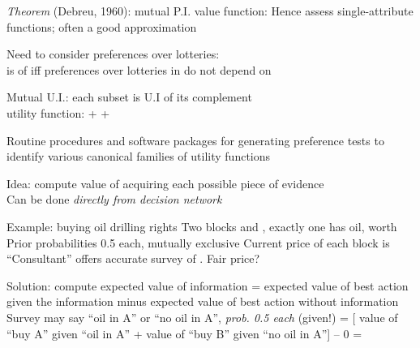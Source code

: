 \documentclass{article}
\begin{document}
\begin{huge}
\emph{Theorem} (Debreu, 1960): mutual P.I. \mat{$\implies$} \mat{$\exists$}  value function:
\mat{\[
  V(S) = \mysum_i V_i(X_i(S))
\]}
Hence assess  single-attribute functions; often a good approximation



Need to consider preferences over lotteries:\\
 is  of  iff\al
  preferences over lotteries in  do not depend on 

Mutual U.I.: each subset is U.I of its complement\\
\mat{$\implies$} \mat{$\exists$}  utility function:\al
{}\nl
 + \nl
 + 

Routine procedures and software packages for generating preference
tests to identify various canonical families of utility functions



Idea: compute value of acquiring each possible piece of evidence\\
Can be done \emph{directly from decision network}

Example: buying oil drilling rights\al
  Two blocks  and , exactly one has oil, worth \al
  Prior probabilities 0.5 each, mutually exclusive\al
  Current price of each block is \al
  ``Consultant'' offers accurate survey of . Fair price?

Solution: compute expected value of information\al
  = expected value of best action given the information\nl
    minus expected value of best action without information\\
Survey may say ``oil in A'' or ``no oil in A'', \emph{prob. 0.5 each} (given!)\al
  = [\mat{$0.5 \times {}$} value of ``buy A'' given ``oil in A''\nl
    + \mat{$0.5 \times {}$} value of ``buy B'' given ``no oil in A'']\nl
    -- 0\al
  = 





\end{huge}
\end{document}
